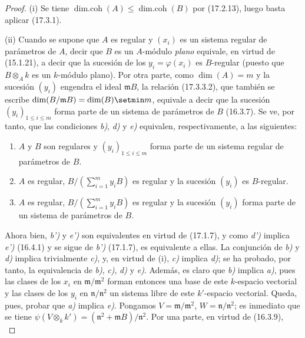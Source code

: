 \begin{proof}
\textnormal{(i)} Se tiene
$\operatorname{dim.coh}(A)\leq\operatorname{dim.coh}(B)$ por (17.2.13), luego
basta aplicar (17.3.1).

\textnormal{(ii)} Cuando se supone que $A$ es regular y $(x_i)$ es un sistema
regular de parámetros de $A$, decir que $B$ es un $A$-módulo \emph{plano}
equivale, en virtud de (15.1.21), a decir que la sucesión de los
$y_i=\varphi(x_i)$ es $B$-regular (puesto que $B\otimes_A k$ es un
$k$-módulo plano). Por otra parte, como $\dim(A)=m$ y la sucesión $(y_i)$
engendra el ideal $\mathfrak{m}B$, la relación (17.3.3.2), que también se
escribe $\dim(B/\mathfrak{m}B)=\dim(B)\setmin m$, equivale a decir que la sucesión
$(y_i)_{1\leq i\leq m}$ forma parte de un sistema de parámetros de $B$
(16.3.7). Se ve, por tanto, que las condiciones \emph{b)}, \emph{d)} y \emph{e)} equivalen,
respectivamente, a las siguientes:
\begin{enumerate}
  \item[\textit{b')}] $A$ y $B$ son regulares y $(y_i)_{1\leq i\leq m}$ forma
  parte de un sistema regular de parámetros de $B$.
  \item[\textit{d')}] $A$ es regular,
  $B/(\sum_{i=1}^m y_iB)$ es regular y la sucesión $(y_i)$ es
  $B$-regular.
  \item[\textit{e')}] $A$ es regular,
  $B/(\sum_{i=1}^m y_iB)$ es regular y la sucesión $(y_i)$ forma parte de un
  sistema de parámetros de $B$.
\end{enumerate}
Ahora bien, \emph{b')} y \emph{e')} son equivalentes en virtud de (17.1.7), y como \emph{d')}
implica \emph{e')} (16.4.1) y se sigue de \emph{b')} (17.1.7), es equivalente a ellas.
La conjunción
de \emph{b)} y \emph{d)} implica trivialmente \emph{c)}, y, en virtud de (i), \emph{c)} implica \emph{d)}; se ha
probado, por tanto, la equivalencia de \emph{b)}, \emph{c)}, \emph{d)} y \emph{e)}. Además, es claro que
\emph{b)} implica \emph{a)}, pues las clases de los $x_i$ en
$\mathfrak{m}/\mathfrak{m}^2$ forman entonces una base de este $k$-espacio
vectorial y las clases de los $y_i$ en $\mathfrak{n}/\mathfrak{n}^2$ un
sistema libre de este $k'$-espacio vectorial. Queda, pues, probar que \emph{a)}
implica \emph{e)}. Pongamos $V=\mathfrak{m}/\mathfrak{m}^2$,
$W=\mathfrak{n}/\mathfrak{n}^2$; es inmediato que se tiene
$\psi(V\otimes_k k')=(\mathfrak{n}^2+\mathfrak{m}B)/\mathfrak{n}^2$. Por una
parte, en virtud de (16.3.9),
\begin{equation}
\label{0.17.3.3.3-fr}

\end{equation}
\end{proof}
